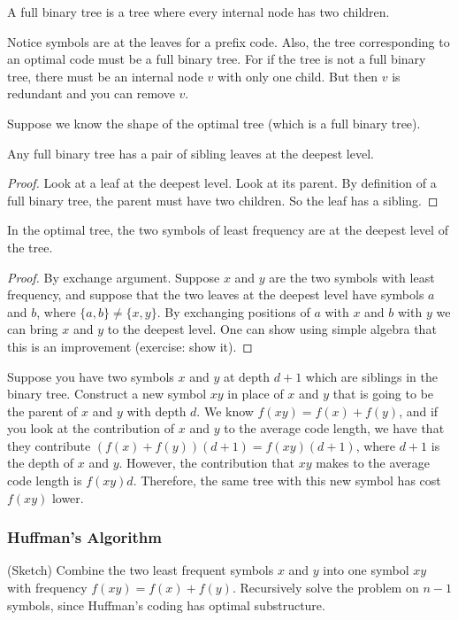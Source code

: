 \begin{definition}
    A full binary tree is a tree where every internal node has two
    children.
\end{definition}

Notice symbols are at the leaves for a prefix code. Also, the tree
corresponding to an optimal code must be a full binary tree. For if the tree is not a full binary
tree, there must be an internal node $v$ with only one child. But then
$v$ is redundant and you can remove $v$.

Suppose we know the shape of the optimal tree (which is a full binary
tree).

\begin{lemma}
    Any full binary tree has a pair of sibling leaves at the deepest
    level.
\end{lemma}

\begin{proof}
    Look at a leaf at the deepest level. Look at its parent. By
    definition of a full binary tree, the parent must have two
    children. So the leaf has a sibling.
\end{proof}

\begin{lemma}
    In the optimal tree, the two symbols of least frequency are at the
    deepest level of the tree.
\end{lemma}

\begin{proof}
    By exchange argument. Suppose $x$ and $y$ are the
two symbols with least frequency, and suppose that the two leaves at
the deepest level have symbols $a$ and $b$, where $\{a, b\} \neq 
\{x,y\}$. By exchanging positions of $a$ with $x$ and $b$ with $y$
we can bring $x$ and $y$ to the deepest level. One can show using
simple algebra that this is an improvement (exercise: show it).
\end{proof}

Suppose you have two symbols $x$ and $y$ at depth $d + 1$ which are
siblings in the binary tree. Construct a new symbol $xy$ in place of
$x$ and $y$ that
is going to be the parent of $x$ and $y$ with depth $d$. 
We know $f(xy) = f(x) + f(y)$, and if you look at the contribution of
$x$ and $y$ to the average code length, we have that they contribute
$(f(x) + f(y))(d+1) = f(xy)(d+1)$, where $d + 1$ is the depth of $x$
and $y$. However, the contribution that $xy$ makes to the average
code length is $f(xy)d$. Therefore, the same tree with this new symbol
has cost $f(xy)$ lower.

\subsubsection{Huffman's Algorithm}

(Sketch) Combine the two least frequent symbols $x$ and $y$ into one
symbol $xy$ with frequency $f(xy) = f(x) + f(y)$. Recursively solve
the problem on $n - 1$ symbols, since Huffman's coding has optimal
substructure.




